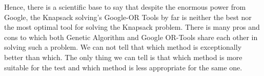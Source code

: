\documentclass{article}
\begin{document}
Hence, there is a scientific base to say that despite the enormous power from Google, the Knapsack solving's Google-OR Tools by far is neither the best nor the most optimal tool for solving the Knapsack problem. There is many pros and cons to which both Genetic Algorithm and Google OR-Tools share each other in solving such a problem. We can not tell that which method is exceptionally better than which. The only thing we can tell is that which method is more suitable for the test and which method is less appropriate for the same one.

\end{document}
